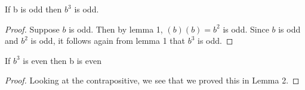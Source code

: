 \documentclass{article}
\begin{document}
\begin{lem}
If b is odd then $b^3$ is odd.
\end{lem}

\begin{proof}
Suppose $b$ is odd. Then by lemma 1, $(b)(b) = b^2$ is odd. Since $b$ is odd and $b^2$ is odd, it follows again from lemma 1 that $b^3$ is odd.
\end{proof}

\begin{lem}
If $b^3$ is even then b is even
\end{lem}

\begin{proof}
Looking at the contrapositive, we see that we proved this in Lemma 2.  
\end{proof}
\end{document}
